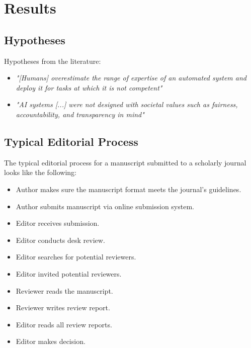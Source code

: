 \section{Results}
\label{sec:results}

\subsection{Hypotheses}

Hypotheses from the literature:

\begin{itemize}
    \item \textit{"[Humans] overestimate the range of expertise of an automated system and deploy it for tasks at which it is not competent"} \citep[p. 19]{akataResearchAgendaHybrid2020}
    \item \textit{"AI systems [...] were not designed with societal values such as fairness, accountability, and transparency in mind"} \citep[p. 19]{akataResearchAgendaHybrid2020}
\end{itemize}



\subsection{Typical Editorial Process}

The typical editorial process for a manuscript submitted to a scholarly journal looks like the following:

\begin{itemize}
    \item Author makes sure the manuscript format meets the journal's guidelines.
    \item Author submits manuscript via online submission system.
    \item Editor receives submission.
    \item Editor conducts desk review.
    \item Editor searches for potential reviewers.
    \item Editor invited potential reviewers.
    \item Reviewer reads the manuscript.
    \item Reviewer writes review report.
    \item Editor reads all review reports.
    \item Editor makes decision.
    
\end{itemize}


